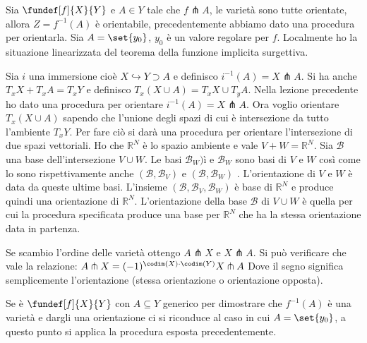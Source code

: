 

Sia $\fundef[f]{X}{Y}$ e $A \in Y$ tale che $f \pitchfork A$, le varietà sono tutte orientate, allora $Z = f^{-1}(A)$ è orientabile, precedentemente abbiamo dato una procedura per orientarla.
Sia $A = \set{y_0}$, $y_0$ è un valore regolare per $f$. Localmente ho la situazione linearizzata del teorema della funzione implicita surgettiva.



\newcommand*\base{\mathcal B}

Sia $i$ una immersione cioè $X \hookrightarrow Y \supset A$ e definisco $i^{-1} (A) = X \pitchfork A$. Si ha anche $T_{x}X + T_{x}A = T_{x}Y$ e definisco $T_{x}(X \cup A) = T_{x}X \cup T_{y}A$. 
Nella lezione precedente ho dato una procedura per orientare $i^{-1} (A) = X \pitchfork A$. Ora voglio orientare  $T_{x}(X \cup A)$ sapendo che l'unione degli spazi di cui è intersezione da tutto l'ambiente $T_{x}Y$. Per fare ciò si darà una procedura per orientare l'intersezione di due spazi vettoriali.
Ho che $\mathbb{R}^{N}$ è lo spazio ambiente e vale $V+W = \mathbb{R}^{N}$. Sia $\base$ una base dell'intersezione $V \cup W $. Le basi $\base_{W})ì$ e $\base_{W}$ sono basi di $V$ e $W$ così come lo sono rispettivamente anche $(\base, \base_{V})$ e  $(\base, \base_{W})$
. L'orientazione di $V$ e $W$ è data da queste ultime basi. L'insieme $(\base, \base_V, \base_W)$ è base di $\mathbb{R}^{N}$ e produce quindi una orientazione di $\mathbb{R}^{N}$.
L'orientazione della base $\base$ di $V \cup W$ è quella per cui la procedura specificata produce una base per $\mathbb{R}^{N}$ che ha la stessa orientazione data in partenza.


\begin{oss}
 Se scambio l'ordine delle varietà ottengo $A \pitchfork X$ e $X \pitchfork A$. Si può verificare che vale la relazione: $ A \pitchfork X = (-1)^{\codim(X) \cdot \codim(Y)} X \pitchfork A$
 Dove il segno significa semplicemente l'orientazione (stessa orientazione o orientazione opposta).
\end{oss}

Se è $\fundef[f]{X}{Y}$ con $A \subseteq Y$ generico per dimostrare che $f^{-1}(A)$ è una varietà e dargli una orientazione
ci si riconduce al caso in cui $A = \set{y_{0}}$, a questo punto si applica la procedura esposta precedentemente.

